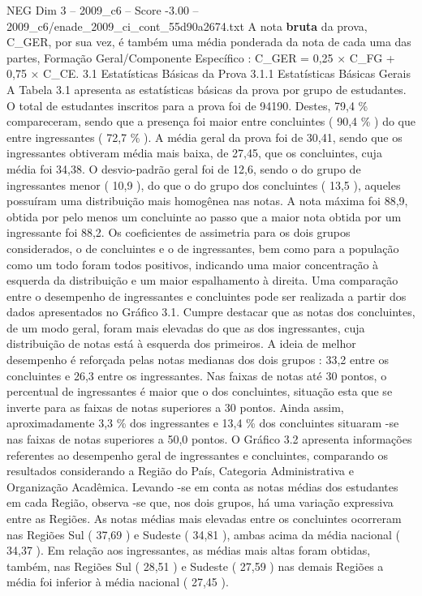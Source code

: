 \begin{textsample}{NEG Dim 3 – 2009\_c6 – Score -3.00 – 2009\_c6/enade\_2009\_ci\_cont\_55d90a2674.txt}
A nota \textbf{bruta} da prova, C\_GER, por sua vez, é também uma média ponderada da nota de cada uma das partes, Formação Geral/Componente Específico : C\_GER = 0,25 × C\_FG + 0,75 × C\_CE. 3.1 Estatísticas Básicas da Prova 3.1.1 Estatísticas Básicas Gerais A Tabela 3.1 apresenta as estatísticas básicas da prova por grupo de estudantes.
O total de estudantes inscritos para a prova foi de 94190.
Destes, 79,4 \% compareceram, sendo que a presença foi maior entre concluintes ( 90,4 \% ) do que entre ingressantes ( 72,7 \% ).
A média geral da prova foi de 30,41, sendo que os ingressantes obtiveram média mais baixa, de 27,45, que os concluintes, cuja média foi 34,38.
O desvio-padrão geral foi de 12,6, sendo o do grupo de ingressantes menor ( 10,9 ), do que o do grupo dos concluintes ( 13,5 ), aqueles possuíram uma distribuição mais homogênea nas notas.
A nota máxima foi 88,9, obtida por pelo menos um concluinte ao passo que a maior nota obtida por um ingressante foi 88,2.
Os coeficientes de assimetria para os dois grupos considerados, o de concluintes e o de ingressantes, bem como para a população como um todo foram todos positivos, indicando uma maior concentração à esquerda da distribuição e um maior espalhamento à direita.
Uma comparação entre o desempenho de ingressantes e concluintes pode ser realizada a partir dos dados apresentados no Gráfico 3.1.
Cumpre destacar que as notas dos concluintes, de um modo geral, foram mais elevadas do que as dos ingressantes, cuja distribuição de notas está à esquerda dos primeiros.
A ideia de melhor desempenho é reforçada pelas notas medianas dos dois grupos : 33,2 entre os concluintes e 26,3 entre os ingressantes.
Nas faixas de notas até 30 pontos, o percentual de ingressantes é maior que o dos concluintes, situação esta que se inverte para as faixas de notas superiores a 30 pontos.
Ainda assim, aproximadamente 3,3 \% dos ingressantes e 13,4 \% dos concluintes situaram -se nas faixas de notas superiores a 50,0 pontos.
O Gráfico 3.2 apresenta informações referentes ao desempenho geral de ingressantes e concluintes, comparando os resultados considerando a Região do País, Categoria Administrativa e Organização Acadêmica.
Levando -se em conta as notas médias dos estudantes em cada Região, observa -se que, nos dois grupos, há uma variação expressiva entre as Regiões.
As notas médias mais elevadas entre os concluintes ocorreram nas Regiões Sul ( 37,69 ) e Sudeste ( 34,81 ), ambas acima da média nacional ( 34,37 ).
Em relação aos ingressantes, as médias mais altas foram obtidas, também, nas Regiões Sul ( 28,51 ) e Sudeste ( 27,59 ) nas demais Regiões a média foi inferior à média nacional ( 27,45 ).

\end{textsample}
